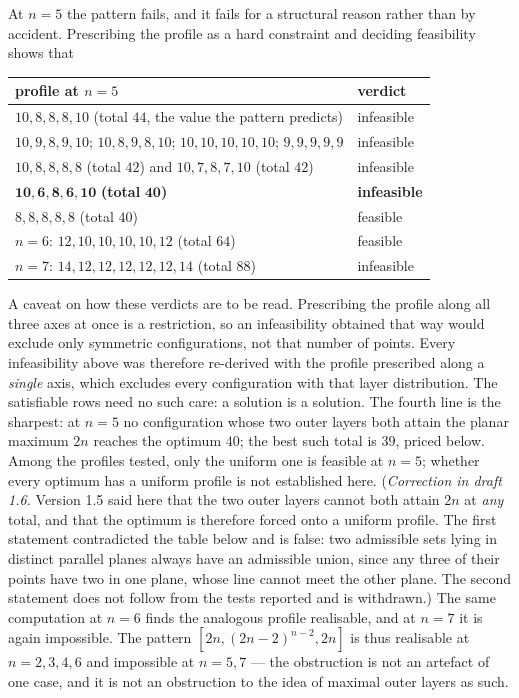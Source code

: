 \documentclass[11pt,a4paper]{article}
\begin{document}
At $n=5$ the pattern fails, and it fails for a structural reason rather than by accident.  Prescribing the
profile as a hard constraint and deciding feasibility shows that
\begin{center}\begin{tabular}{ll}\toprule
profile at $n=5$ & verdict\\\midrule
$10,8,8,8,10$ (total $44$, the value the pattern predicts) & infeasible\\
$10,9,8,9,10$; $10,8,9,8,10$; $10,10,10,10,10$; $9,9,9,9,9$ & infeasible\\
$10,8,8,8,8$ (total $42$) and $10,7,8,7,10$ (total $42$) & infeasible\\
$\mathbf{10,6,8,6,10}$ \textbf{(total }$\mathbf{40}$\textbf{)} & \textbf{infeasible}\\
$8,8,8,8,8$ (total $40$) & feasible\\\midrule
$n=6$: $12,10,10,10,10,12$ (total $64$) & feasible\\
$n=7$: $14,12,12,12,12,12,14$ (total $88$) & infeasible\\\bottomrule
\end{tabular}\end{center}
A caveat on how these verdicts are to be read.  Prescribing the profile along all three axes at once is a
restriction, so an infeasibility obtained that way would exclude only symmetric configurations, not that number
of points.  Every infeasibility above was therefore re-derived with the profile prescribed along a
\emph{single} axis, which excludes every configuration with that layer distribution.  The satisfiable rows need
no such care: a solution is a solution.
The fourth line is the sharpest: at $n=5$ no configuration whose two outer layers both attain the planar
maximum $2n$ reaches the optimum $40$; the best such total is $39$, priced below.  Among the profiles tested,
only the uniform one is feasible at $n=5$; whether every optimum has a uniform profile is not established here.
(\emph{Correction in draft 1.6.}  Version 1.5 said here that the two outer layers cannot both attain $2n$ at
\emph{any} total, and that the optimum is therefore forced onto a uniform profile.  The first statement
contradicted the table below and is false: two admissible sets lying in distinct parallel planes always have an
admissible union, since any three of their points have two in one plane, whose line cannot meet the other
plane.  The second statement does not follow from the tests reported and is withdrawn.)  The same computation at $n=6$ finds the
analogous profile realisable, and at $n=7$ it is again impossible.  The pattern $[2n,(2n-2)^{n-2},2n]$ is thus
realisable at $n=2,3,4,6$ and impossible at $n=5,7$ --- the obstruction is not an artefact of one case, and it
is not an obstruction to the idea of maximal outer layers as such.
\end{document}
